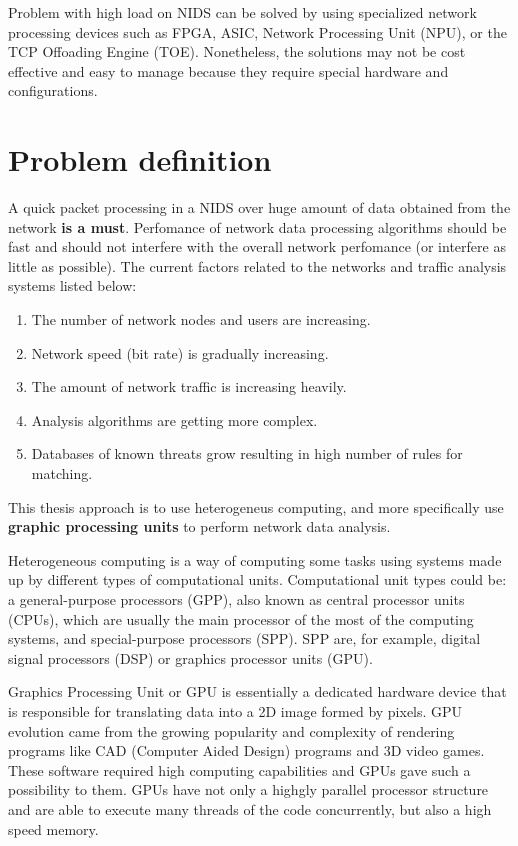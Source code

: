 \documentclass[thesis=M,english]{FITthesis}[2011/07/15]
\begin{document}
Problem with high load on NIDS can be solved by using specialized network processing devices such as FPGA, ASIC, Network Processing Unit (NPU), or the TCP Offoading Engine (TOE). Nonetheless, the solutions may not be cost effective and easy to manage because they require special hardware and configurations.

\section{Problem definition}
A quick packet processing in a NIDS over huge amount of data obtained from the network \textbf{is a must}. Perfomance of network data processing algorithms should be fast and should not interfere with the overall network perfomance (or interfere as little as possible).
The current factors related to the networks and traffic analysis systems listed below:
\begin{enumerate}
\item The number of network nodes and users are increasing. 
\item Network speed (bit rate) is gradually increasing.
\item The amount of network traffic is increasing heavily.
\item Analysis algorithms are getting more complex.
\item Databases of known threats grow resulting in high number of rules for matching.
\end{enumerate}

This thesis approach is to use heterogeneus computing, and more specifically use \textbf{graphic processing units} to perform network data analysis.

Heterogeneous computing is a way of computing some tasks using systems made up by different types of computational units. Computational unit types could be: a general-purpose processors (GPP), also known as central processor units (CPUs), which are usually the main processor of the most of the computing systems, and special-purpose processors (SPP). SPP are, for example, digital signal processors (DSP) or graphics processor units (GPU).

Graphics Processing Unit or GPU is essentially a dedicated hardware device that is responsible for translating data into a 2D image formed by pixels. GPU evolution came from the growing popularity and complexity of rendering programs like CAD (Computer Aided Design) programs and 3D video games. These software required high computing capabilities and GPUs gave such a possibility to them. GPUs have not only a highgly parallel processor structure and are able to execute many threads of the code concurrently, but also a high speed memory.
\end{document}
